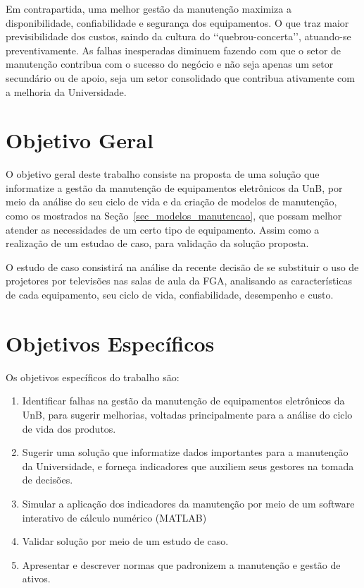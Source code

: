 Em contrapartida, uma melhor gestão da manutenção maximiza a disponibilidade, confiabilidade e segurança dos equipamentos. O que traz maior previsibilidade dos custos, saindo da cultura do \lq\lq quebrou-concerta\rq\rq, atuando-se preventivamente. As falhas inesperadas diminuem fazendo com que o setor de manutenção contribua com o sucesso do negócio e não seja apenas um setor secundário ou de apoio, seja um setor consolidado que contribua ativamente com a melhoria da Universidade.




\section{Objetivo Geral}
 
O objetivo geral deste trabalho consiste na proposta de uma solução que informatize a gestão da manutenção de equipamentos eletrônicos da UnB, por meio da análise do seu ciclo de vida e da criação de modelos de manutenção, como os mostrados na Seção~\ref{sec_modelos_manutencao}, que possam melhor atender as necessidades de um certo tipo de equipamento. Assim como a realização de um estudao de caso, para validação da solução proposta. 

O estudo de caso consistirá na análise da recente decisão de se substituir o uso de projetores por televisões nas salas de aula da FGA, analisando as características de cada equipamento, seu ciclo de vida, confiabilidade, desempenho e custo.



\section{Objetivos Específicos}

Os objetivos específicos do trabalho são:

\begin{enumerate}
	\item Identificar falhas na gestão da manutenção de equipamentos eletrônicos da UnB, para sugerir melhorias, voltadas principalmente para a análise do ciclo de vida dos produtos.
	\item Sugerir uma solução que informatize dados importantes para a manutenção da Universidade, e forneça indicadores que auxiliem seus gestores na tomada de decisões.
	\item Simular a aplicação dos indicadores da manutenção por meio de um software interativo de cálculo numérico (MATLAB) 
	\item Validar solução por meio de um estudo de caso.
	\item Apresentar e descrever normas que padronizem a manutenção e gestão de ativos.
\end{enumerate}

